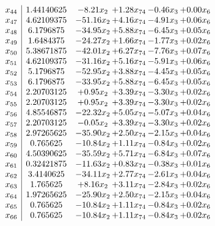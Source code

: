 \documentclass[8pt]{article}
\begin{document}
\[\begin{array}{c| c c@{\hskip 2pt} c@{\hskip 2pt} c@{\hskip 2pt} c@{\hskip 2pt} }
 x_{44}   &  1.44140625 & -8.21 x_{2} & +  1.28 x_{74} & -0.46 x_{3} & +  0.00 x_{6}\\
 x_{47}   &  4.62109375 & -51.16 x_{2} & +  4.16 x_{74} & -4.91 x_{3} & +  0.06 x_{6}\\
 x_{48}   &  6.1796875 & -34.95 x_{2} & +  5.88 x_{74} & -6.45 x_{3} & +  0.05 x_{6}\\
 x_{49}   &  1.6484375 & -24.27 x_{2} & +  1.66 x_{74} & -1.77 x_{3} & +  0.02 x_{6}\\
 x_{50}   &  5.38671875 & -42.01 x_{2} & +  6.27 x_{74} & -7.76 x_{3} & +  0.07 x_{6}\\
 x_{51}   &  4.62109375 & -31.16 x_{2} & +  5.16 x_{74} & -5.91 x_{3} & +  0.06 x_{6}\\
 x_{52}   &  5.1796875 & -52.95 x_{2} & +  3.88 x_{74} & -4.45 x_{3} & +  0.05 x_{6}\\
 x_{53}   &  6.1796875 & -33.95 x_{2} & +  5.88 x_{74} & -6.45 x_{3} & +  0.05 x_{6}\\
 x_{54}   &  2.20703125 & +  0.95 x_{2} & +  3.39 x_{74} & -3.30 x_{3} & +  0.02 x_{6}\\
 x_{55}   &  2.20703125 & +  0.95 x_{2} & +  3.39 x_{74} & -3.30 x_{3} & +  0.02 x_{6}\\
 x_{56}   &  4.85546875 & -22.32 x_{2} & +  5.05 x_{74} & -5.07 x_{3} & +  0.04 x_{6}\\
 x_{57}   &  2.20703125 & -0.05 x_{2} & +  3.39 x_{74} & -3.30 x_{3} & +  0.02 x_{6}\\
 x_{58}   &  2.97265625 & -35.90 x_{2} & +  2.50 x_{74} & -2.15 x_{3} & +  0.04 x_{6}\\
 x_{59}   &  0.765625 & -10.84 x_{2} & +  1.11 x_{74} & -0.84 x_{3} & +  0.02 x_{6}\\
 x_{60}   &  4.50390625 & -35.59 x_{2} & +  5.71 x_{74} & -6.84 x_{3} & +  0.07 x_{6}\\
 x_{61}   &  0.32421875 & -11.63 x_{2} & +  0.83 x_{74} & -0.38 x_{3} & +  0.01 x_{6}\\
 x_{62}   &  3.4140625 & -34.11 x_{2} & +  2.77 x_{74} & -2.61 x_{3} & +  0.04 x_{6}\\
 x_{63}   &  1.765625 & +  8.16 x_{2} & +  3.11 x_{74} & -2.84 x_{3} & +  0.02 x_{6}\\
 x_{64}   &  1.97265625 & -25.90 x_{2} & +  2.50 x_{74} & -2.15 x_{3} & +  0.04 x_{6}\\
 x_{65}   &  0.765625 & -10.84 x_{2} & +  1.11 x_{74} & -0.84 x_{3} & +  0.02 x_{6}\\
 x_{66}   &  0.765625 & -10.84 x_{2} & +  1.11 x_{74} & -0.84 x_{3} & +  0.02 x_{6}\\

\end{array}\]
\end{document}
